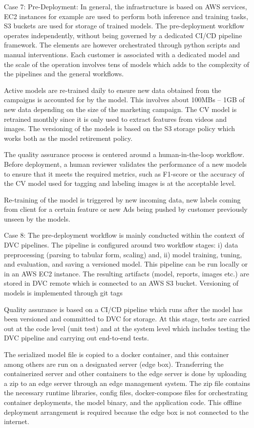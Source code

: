 Case 7: Pre-Deployment: In general, the infrastructure is based on AWS services, EC2 instances for example are used to perform both inference and training tasks, S3 buckets are used for storage of trained models. The pre-deployment workflow operates independently, without being governed by a dedicated CI/CD pipeline framework. The elements are however orchestrated through python scripts and manual interventions. Each customer is associated with a dedicated model and the scale of the operation involves tens of models which adds to the complexity of the pipelines and the general workflows.

Active models are re-trained daily to ensure new data obtained from the campaigns is accounted for by the model. This involves about 100MBs – 1GB of new data depending on the size of the marketing campaign. The CV model is retrained monthly since it is only used to extract features from videos and images. The versioning of the models is based on the S3 storage policy which works both as the model retirement policy.

The quality assurance process is centered around a human-in-the-loop workflow. Before deployment, a human reviewer validates the performance of a new models to ensure that it meets the required metrics, such as F1-score or the accuracy of the CV model used for tagging and labeling images is at the acceptable level.

Re-training of the model is triggered by new incoming data, new labels coming from client for a certain feature or new Ads being pushed by customer previously unseen by the models.

Case 8: The pre-deployment workflow is mainly conducted within the context of DVC pipelines. The pipeline is configured around two workflow stages: i) data preprocessing (parsing to tabular form, scaling) and, ii) model training, tuning, and evaluation, and saving a versioned model. This pipeline can be run locally or in an AWS EC2 instance. The resulting artifacts (model, reports, images etc.) are stored in DVC remote which is connected to an AWS S3 bucket. Versioning of models is implemented through git tags

Quality assurance is based on a CI/CD pipeline which runs after the model has been versioned and committed to DVC for storage.  At this stage, tests are carried out at the code level (unit test) and at the system level which includes testing the DVC pipeline and carrying out end-to-end tests.

The serialized model file is copied to a docker container, and this container among others are run on a designated server (edge box). Transferring the containerized server and other containers to the edge server is done by uploading a zip to an edge server through an edge management system. The zip file contains the necessary runtime libraries, config files, docker-compose files for orchestrating container deployments, the model binary, and the application code. This offline deployment arrangement is required because the edge box is not connected to the internet.